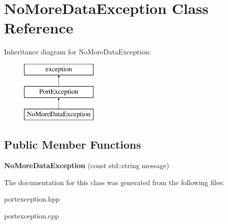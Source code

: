 \hypertarget{class_no_more_data_exception}{}\section{No\+More\+Data\+Exception Class Reference}
\label{class_no_more_data_exception}
Inheritance diagram for No\+More\+Data\+Exception\+:\begin{figure}[H]
\begin{center}
\leavevmode
\includegraphics[height=3.000000cm]{class_no_more_data_exception}
\end{center}
\end{figure}
\subsection*{Public Member Functions}
\begin{DoxyCompactItemize}
\item 
\hypertarget{class_no_more_data_exception_a0ea678409efce101125c8ad818102011}{}{\bfseries No\+More\+Data\+Exception} (const std\+::string message)\label{class_no_more_data_exception_a0ea678409efce101125c8ad818102011}

\end{DoxyCompactItemize}


The documentation for this class was generated from the following files\+:\begin{DoxyCompactItemize}
\item 
portexception.\+hpp\item 
portexception.\+cpp\end{DoxyCompactItemize}
